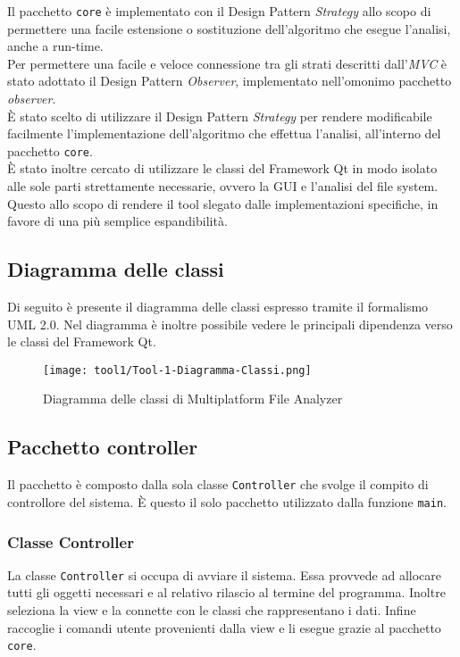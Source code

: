 	Il pacchetto \texttt{core} è implementato con il Design Pattern \textit{Strategy} allo scopo di permettere una facile estensione o sostituzione dell'algoritmo che esegue l'analisi, anche a run-time.\\
	
	Per permettere una facile e veloce connessione tra gli strati descritti dall'\textit{MVC} è stato adottato il Design Pattern \textit{Observer}, implementato nell'omonimo pacchetto \textit{observer}.\\
	
	È stato scelto di utilizzare il Design Pattern \textit{Strategy} per rendere modificabile facilmente l'implementazione dell'algoritmo che effettua l'analisi, all'interno del pacchetto \texttt{core}.\\
	
	È stato inoltre cercato di utilizzare le classi del Framework Qt\textsuperscript{\textregistered} in modo isolato alle sole parti strettamente necessarie, ovvero la GUI e l'analisi del file system. Questo allo scopo di rendere il tool slegato dalle implementazioni specifiche, in favore di una più semplice espandibilità.
	
	\subsection{Diagramma delle classi}
		Di seguito è presente il diagramma delle classi espresso tramite il formalismo UML 2.0. Nel diagramma è inoltre possibile vedere le principali dipendenza verso le classi del Framework Qt\textsuperscript{\textregistered}.
		
		\begin{figure}[p] 
			\centering
			\hspace*{-0.0375\columnwidth}\texttt{[image: tool1/Tool-1-Diagramma-Classi.png]} 
			\caption{Diagramma delle classi di Multiplatform File Analyzer}
		\end{figure}
	
		\newpage
	
	\subsection{Pacchetto controller}
		Il pacchetto è composto dalla sola classe \texttt{Controller} che svolge il compito di controllore del sistema. È questo il solo pacchetto utilizzato dalla funzione \texttt{main}.
		
		\subsubsection{Classe Controller}
			La classe \texttt{Controller} si occupa di avviare il sistema. Essa provvede ad allocare tutti gli oggetti necessari e al relativo rilascio al termine del programma. Inoltre seleziona la view e la connette con le classi che rappresentano i dati. Infine raccoglie i comandi utente provenienti dalla view e li esegue grazie al pacchetto \texttt{core}.
	
